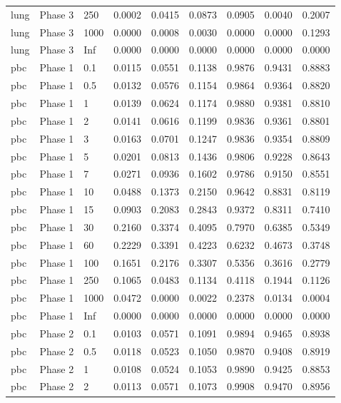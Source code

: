 \begin{tabular}{lllllllll}
  lung & Phase 3 & 250 & 0.0002 & 0.0415 & 0.0873 & 0.0905 & 0.0040 & 0.2007 \\ 
  lung & Phase 3 & 1000 & 0.0000 & 0.0008 & 0.0030 & 0.0000 & 0.0000 & 0.1293 \\ 
  lung & Phase 3 & Inf & 0.0000 & 0.0000 & 0.0000 & 0.0000 & 0.0000 & 0.0000 \\ 
  pbc & Phase 1 & 0.1 & 0.0115 & 0.0551 & 0.1138 & 0.9876 & 0.9431 & 0.8883 \\ 
  pbc & Phase 1 & 0.5 & 0.0132 & 0.0576 & 0.1154 & 0.9864 & 0.9364 & 0.8820 \\ 
  pbc & Phase 1 & 1 & 0.0139 & 0.0624 & 0.1174 & 0.9880 & 0.9381 & 0.8810 \\ 
  pbc & Phase 1 & 2 & 0.0141 & 0.0616 & 0.1199 & 0.9836 & 0.9361 & 0.8801 \\ 
  pbc & Phase 1 & 3 & 0.0163 & 0.0701 & 0.1247 & 0.9836 & 0.9354 & 0.8809 \\ 
  pbc & Phase 1 & 5 & 0.0201 & 0.0813 & 0.1436 & 0.9806 & 0.9228 & 0.8643 \\ 
  pbc & Phase 1 & 7 & 0.0271 & 0.0936 & 0.1602 & 0.9786 & 0.9150 & 0.8551 \\ 
  pbc & Phase 1 & 10 & 0.0488 & 0.1373 & 0.2150 & 0.9642 & 0.8831 & 0.8119 \\ 
  pbc & Phase 1 & 15 & 0.0903 & 0.2083 & 0.2843 & 0.9372 & 0.8311 & 0.7410 \\ 
  pbc & Phase 1 & 30 & 0.2160 & 0.3374 & 0.4095 & 0.7970 & 0.6385 & 0.5349 \\ 
  pbc & Phase 1 & 60 & 0.2229 & 0.3391 & 0.4223 & 0.6232 & 0.4673 & 0.3748 \\ 
  pbc & Phase 1 & 100 & 0.1651 & 0.2176 & 0.3307 & 0.5356 & 0.3616 & 0.2779 \\ 
  pbc & Phase 1 & 250 & 0.1065 & 0.0483 & 0.1134 & 0.4118 & 0.1944 & 0.1126 \\ 
  pbc & Phase 1 & 1000 & 0.0472 & 0.0000 & 0.0022 & 0.2378 & 0.0134 & 0.0004 \\ 
  pbc & Phase 1 & Inf & 0.0000 & 0.0000 & 0.0000 & 0.0000 & 0.0000 & 0.0000 \\ 
  pbc & Phase 2 & 0.1 & 0.0103 & 0.0571 & 0.1091 & 0.9894 & 0.9465 & 0.8938 \\ 
  pbc & Phase 2 & 0.5 & 0.0118 & 0.0523 & 0.1050 & 0.9870 & 0.9408 & 0.8919 \\ 
  pbc & Phase 2 & 1 & 0.0108 & 0.0524 & 0.1053 & 0.9890 & 0.9425 & 0.8853 \\ 
  pbc & Phase 2 & 2 & 0.0113 & 0.0571 & 0.1073 & 0.9908 & 0.9470 & 0.8956 \\ 

\end{tabular}
